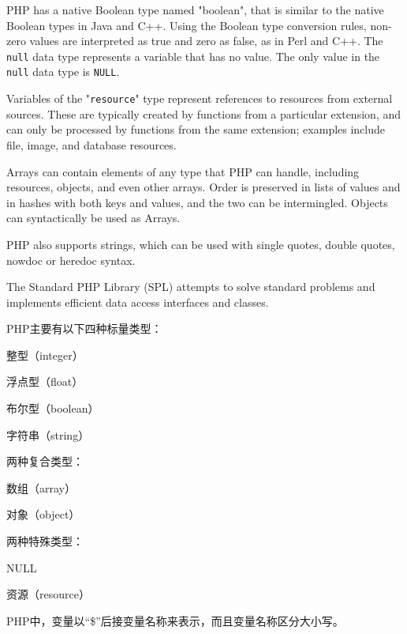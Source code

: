PHP has a native Boolean type  named "boolean", that is similar to the native Boolean types in Java and C++. Using the Boolean type conversion rules, non-zero values are interpreted as true and zero as false, as in Perl and C++. The \texttt{null} data type represents a variable that has no value. The only value in the \texttt{null} data type is \texttt{NULL}. 

Variables of the "\texttt{resource}" type represent references to resources from external sources. These are typically created by functions from a particular extension, and can only be processed by functions from the same extension; examples include file, image, and database resources. 

Arrays can contain elements of any type that PHP can handle, including resources, objects, and even other arrays. Order is preserved in lists of values and in hashes with both keys and values, and the two can be intermingled. Objects can syntactically be used as Arrays.

PHP also supports strings, which can be used with single quotes, double quotes, nowdoc or heredoc syntax.

The Standard PHP Library (SPL) attempts to solve standard problems and implements efficient data access interfaces and classes.


PHP主要有以下四种标量类型：

\begin{compactitem}
\item 整型（integer）
\item 浮点型（float）
\item 布尔型（boolean）
\item 字符串（string）
\end{compactitem}

两种复合类型：

\begin{compactitem}
\item 数组（array）
\item 对象（object）
\end{compactitem}

两种特殊类型：


\begin{compactitem}
\item NULL
\item 资源（resource）
\end{compactitem}


PHP中，变量以“\$”后接变量名称来表示，而且变量名称区分大小写。

